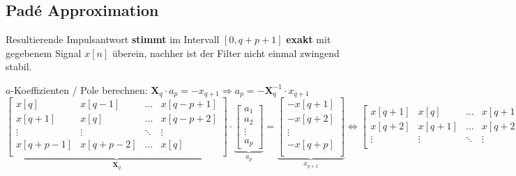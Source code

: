 \subsection{Padé Approximation }
Resultierende Impulsantwort \textbf{stimmt} im Intervall $[0, q + p + 1]$ \textbf{exakt} mit
gegebenem Signal $x[n]$ überein, nachher ist der Filter nicht einmal zwingend stabil.

	\renewcommand{\arraystretch}{1.0}
	\begin{aufzaehlung}
  		\item $a$-Koeffizienten / Pole berechnen: $\bm X_q \cdot a_p = -x_{q+1} \Longrightarrow a_p = - \bm X_q^{-1} \cdot x_{q+1}$  \small $$
		\underbrace{ \begin{bmatrix}
    		x[q]     & x[q-1]   & \hdots & x[q-p+1] \\                                   
    		x[q+1]   & x[q]     & \hdots & x[q-p+2] \\
    		\vdots   & \vdots   & \ddots & \vdots \\                             
    		x[q+p-1] & x[q+p-2] & \hdots & x[q] \\
		\end{bmatrix}  
		}_{\bm  X_q} \cdot 
		\underbrace{\begin{bmatrix}
    		a_1 \\
    		a_2 \\
    		\vdots \\
    		a_p
		\end{bmatrix}  }_{a_p} = \underbrace{\begin{bmatrix}
    		-x [q+1]\\            
    		-x [q+2]\\
    		\vdots \\
    		-x [q+p]\\
		\end{bmatrix}}_{x_{q+1}}  \Longleftrightarrow 
		\begin{bmatrix}
    		x[q+1] & x[q] & \hdots & x[q+1-p] \\                                   
    		x[q+2] & x[q+1] & \hdots & x[q+2-p] \\
    		\vdots & \vdots & \ddots & \vdots \\                             

\end{bmatrix}$$
\end{aufzaehlung}
